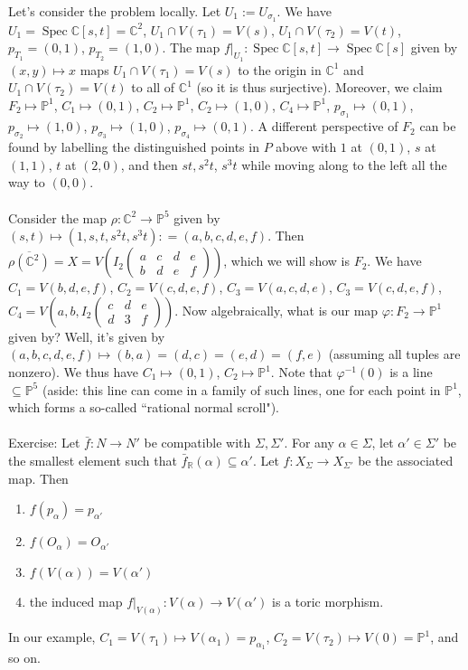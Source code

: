 \documentclass[a4paper,12pt]{amsart}
\newcommand{\C}{\ensuremath{\mathbb{C}}}
\newcommand{\R}{\ensuremath{\mathbb{R}}}
\DeclareMathOperator{\Spec}{Spec}
\begin{document}
\begin{example}
	Let's consider the problem locally. Let $U_1 := U_{\sigma_1}$. We have $U_1 = \Spec \C[s,t] = \C^2$, $U_1 \cap V(\tau_1) = V(s), \, U_1 \cap V(\tau_2) = V(t)$, $p_{T_1} = (0,1)$, $p_{T_2} = (1,0)$. The map $f|_{U_1} : \Spec \C[s,t] \to \Spec \C[s]$ given by $(x,y) \mapsto x$ maps $U_1 \cap V(\tau_1) = V(s)$ to the origin in $\C^1$ and $U_1 \cap V(\tau_2) = V(t)$ to all of $\C^1$ (so it is thus surjective). Moreover, we claim $F_2 \mapsto \mathbb{P}^1$, $C_1 \mapsto (0,1)$, $C_2 \mapsto \mathbb{P}^1$, $C_2 \mapsto (1,0)$, $C_4 \mapsto \mathbb{P}^1$, $p_{\sigma_1} \mapsto (0,1)$, $p_{\sigma_2} \mapsto (1,0)$, $p_{\sigma_3} \mapsto (1,0)$, $p_{\sigma_4} \mapsto (0,1)$. A different perspective of $F_2$ can be found by labelling the distinguished points in $P$ above with $1$ at $(0,1)$, $s$ at $(1,1)$, $t$ at $(2,0)$, and then $st, s^2 t$, $s^3t$ while moving along to the left all the way to $(0,0)$.
	\\\\
	Consider the map $\rho: \C^2 \to \mathbb{P}^5$ given by $(s,t) \mapsto (1,s,t,s^2t, s^3 t) : = (a,b,c,d,e,f)$. Then $\overline{\rho(\C^2)} = X = V \left(I_2 \begin{pmatrix} a & c & d & e \\ b & d & e & f \end{pmatrix}\right)$, which we will show is $F_2$. We have $C_1 = V(b,d,e,f)$, $C_2 = V(c,d,e,f)$, $C_3 = V(a,c, d, e)$, $C_3 = V(c,d,e,f)$, $C_4 = V \left(a,b, I_2\begin{pmatrix} c & d & e \\ d & 3 &f \end{pmatrix} \right)$. Now algebraically, what is our map $\varphi: F_2 \to \mathbb{P}^1$ given by? Well, it's given by $(a,b,c,d,e,f) \mapsto (b,a) = (d,c) = (e,d) = (f,e)$ (assuming all tuples are nonzero). We thus have $C_1 \mapsto (0,1)$, $C_2 \mapsto\mathbb{P}^1$. Note that $\varphi^{-1}(0)$ is a line $\subseteq \mathbb{P}^5$ (aside: this line can come in a family of such lines, one for each point in $\mathbb{P}^1$, which forms a so-called ``rational normal scroll").
	\\\\
	Exercise: Let $\bar{f} : N \to N'$ be compatible with $\Sigma, \Sigma'$. For any $\alpha \in \Sigma$, let $\alpha' \in \Sigma'$ be the smallest element such that $\bar{f}_{\R}(\alpha) \subseteq \alpha'$. Let $f: X_\Sigma \to X_{\Sigma'}$ be the associated map. Then
	\begin{enumerate}
	    \item $f(p_\alpha) = p_{\alpha'}$
	    \item $f(O_{\alpha}) = O_{\alpha'}$
	    \item $f(V(\alpha)) = V(\alpha')$
	    \item the induced map $f|_{V(\alpha)} : V(\alpha) \to V(\alpha')$ is a toric morphism.
	\end{enumerate}
	\noindent In our example, $C_1 = V(\tau_1) \mapsto V(\alpha_1) = p_{\alpha_1}$, $C_2 = V(\tau_2) \mapsto V(0) = \mathbb{P}^1$, and so on.
\end{example}
\end{document}
